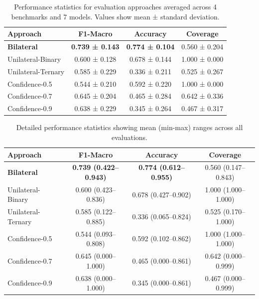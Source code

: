 \begin{table}[htbp]
\centering
\caption{Performance statistics for evaluation approaches averaged across 4 benchmarks and 7 models. Values show mean ± standard deviation.}
\begin{tabular}{l|ccc}
\toprule
\textbf{Approach} & \textbf{F1-Macro} & \textbf{Accuracy} & \textbf{Coverage} \\
\midrule
\textbf{Bilateral} & \textbf{0.739 ± 0.143} & \textbf{0.774 ± 0.104} & 0.560 ± 0.204 \\
Unilateral-Binary & 0.600 ± 0.128 & 0.678 ± 0.144 & 1.000 ± 0.000 \\
Unilateral-Ternary & 0.585 ± 0.229 & 0.336 ± 0.211 & 0.525 ± 0.267 \\
Confidence-0.5 & 0.544 ± 0.210 & 0.592 ± 0.220 & 1.000 ± 0.000 \\
Confidence-0.7 & 0.645 ± 0.204 & 0.465 ± 0.284 & 0.642 ± 0.336 \\
Confidence-0.9 & 0.638 ± 0.229 & 0.345 ± 0.264 & 0.467 ± 0.317 \\
\bottomrule
\end{tabular}
\end{table}

\begin{table}[htbp]
\centering
\caption{Detailed performance statistics showing mean (min-max) ranges across all evaluations.}
\begin{tabular}{l|ccc}
\toprule
\textbf{Approach} & \textbf{F1-Macro} & \textbf{Accuracy} & \textbf{Coverage} \\
\midrule
\textbf{Bilateral} & \textbf{0.739 (0.422–0.943)} & \textbf{0.774 (0.612–0.955)} & 0.560 (0.147–0.843) \\
Unilateral-Binary & 0.600 (0.423–0.836) & 0.678 (0.427–0.902) & 1.000 (1.000–1.000) \\
Unilateral-Ternary & 0.585 (0.122–0.885) & 0.336 (0.065–0.824) & 0.525 (0.170–1.000) \\
Confidence-0.5 & 0.544 (0.093–0.808) & 0.592 (0.102–0.862) & 1.000 (1.000–1.000) \\
Confidence-0.7 & 0.645 (0.000–1.000) & 0.465 (0.000–0.861) & 0.642 (0.000–0.999) \\
Confidence-0.9 & 0.638 (0.000–1.000) & 0.345 (0.000–0.861) & 0.467 (0.000–0.999) \\
\bottomrule
\end{tabular}
\end{table}

